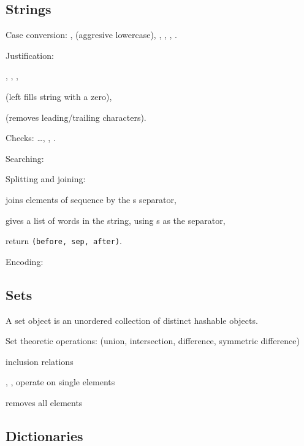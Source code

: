 \subsection{Strings}
\begin{enumx}
\item Case conversion: 
, 
 (aggresive lowercase), 
, 
, 
, 
.

\item Justification: 
\begin{itemx}
	\item {},
		  ,
	      ,

	\item {} 
	(left fills string with a zero),

	\item {} 
	(removes leading/trailing characters).
\end{itemx}

\item Checks:
\ldots,
, 
.

\item Searching:

\item Splitting and joining:
\begin{itemx}
	\item {} joins elements of sequence by the s separator,
	\item {} gives a list of words in the string, using s as the separator,
	\item {} return \texttt{(before, sep, after)}.
\end{itemx}

\item Encoding: 
\end{enumx}

 \subsection{Sets}                                                               
 A set object is an unordered collection of distinct hashable objects.           
 \begin{enumx}                                                                   
 \item Set theoretic operations: \python{| \& - \^}                              
   (union, intersection, difference, symmetric difference)                       
 \item \python{< <= > >=} inclusion relations                                    
 \item {}, ,  operate on single elements
 \item {} removes all elements                                       
 \end{enumx}

\subsection{Dictionaries}
